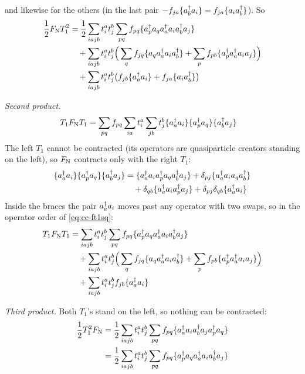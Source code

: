 and likewise for the others (in the last pair $-f_{ja} \{a^{\dagger}_{b} a_{i}\} = f_{ja} \{a_{i} a^{\dagger}_{b}\}$). So
\begin{align}
\frac{1}{2} F_{\mathrm{N}} T_1^2 &= \frac{1}{2} \sum_{iajb} t_i^a t_j^b \sum_{pq} f_{pq} \{a^{\dagger}_{p} a_{q} a^{\dagger}_{a} a_{i} a^{\dagger}_{b} a_{j}\} \notag \\
&\quad + \sum_{iajb} t_i^a t_j^b \Big(\sum_q f_{jq} \{a_{q} a^{\dagger}_{a} a_{i} a^{\dagger}_{b}\} + \sum_p f_{pb} \{a^{\dagger}_{p} a^{\dagger}_{a} a_{i} a_{j}\}\Big) \notag \\
&\quad + \sum_{iajb} t_i^a t_j^b \big(f_{jb} \{a^{\dagger}_{a} a_{i}\} + f_{ja} \{a_{i} a^{\dagger}_{b}\}\big) \label{eq:cc-ft1sq}
\end{align}

\emph{Second product.}
\begin{align*}
T_1 F_{\mathrm{N}} T_1 &= \sum_{pq} f_{pq} \sum_{ia} t_i^a \sum_{jb} t_j^b \{a^{\dagger}_{a} a_{i}\} \{a^{\dagger}_{p} a_{q}\} \{a^{\dagger}_{b} a_{j}\}
\end{align*}
The left $T_1$ cannot be contracted (its operators are quasiparticle creators standing on the left), so $F_{\mathrm{N}}$ contracts only with the right $T_1$:
\begin{align*}
\{a^{\dagger}_{a} a_{i}\} \{a^{\dagger}_{p} a_{q}\} \{a^{\dagger}_{b} a_{j}\} &= \{a^{\dagger}_{a} a_{i} a^{\dagger}_{p} a_{q} a^{\dagger}_{b} a_{j}\} + \delta_{pj} \{a^{\dagger}_{a} a_{i} a_{q} a^{\dagger}_{b}\} \\
&\quad + \delta_{qb} \{a^{\dagger}_{a} a_{i} a^{\dagger}_{p} a_{j}\} + \delta_{pj} \delta_{qb} \{a^{\dagger}_{a} a_{i}\}
\end{align*}
Inside the braces the pair $a^{\dagger}_{a} a_{i}$ moves past any operator with two swaps, so in the operator order of \eqref{eq:cc-ft1sq}:
\begin{align}
T_1 F_{\mathrm{N}} T_1 &= \sum_{iajb} t_i^a t_j^b \sum_{pq} f_{pq} \{a^{\dagger}_{p} a_{q} a^{\dagger}_{a} a_{i} a^{\dagger}_{b} a_{j}\} \notag \\
&\quad + \sum_{iajb} t_i^a t_j^b \Big(\sum_q f_{jq} \{a_{q} a^{\dagger}_{a} a_{i} a^{\dagger}_{b}\} + \sum_p f_{pb} \{a^{\dagger}_{p} a^{\dagger}_{a} a_{i} a_{j}\}\Big) \notag \\
&\quad + \sum_{iajb} t_i^a t_j^b f_{jb} \{a^{\dagger}_{a} a_{i}\} \label{eq:cc-t1ft1}
\end{align}

\emph{Third product.} Both $T_1$'s stand on the left, so nothing can be contracted:
\begin{align}
\frac{1}{2} T_1^2 F_{\mathrm{N}} &= \frac{1}{2} \sum_{iajb} t_i^a t_j^b \sum_{pq} f_{pq} \{a^{\dagger}_{a} a_{i} a^{\dagger}_{b} a_{j} a^{\dagger}_{p} a_{q}\} \notag \\
&= \frac{1}{2} \sum_{iajb} t_i^a t_j^b \sum_{pq} f_{pq} \{a^{\dagger}_{p} a_{q} a^{\dagger}_{a} a_{i} a^{\dagger}_{b} a_{j}\} \label{eq:cc-t1sqf}
\end{align}

